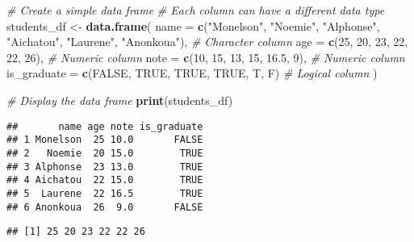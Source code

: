 \documentclass[
]{book}
\newenvironment{Shaded}{\begin{snugshade}}{\end{snugshade}}
\newcommand{\AttributeTok}[1]{\textcolor[rgb]{0.13,0.29,0.53}{#1}}
\newcommand{\CommentTok}[1]{\textcolor[rgb]{0.56,0.35,0.01}{\textit{#1}}}
\newcommand{\ConstantTok}[1]{\textcolor[rgb]{0.56,0.35,0.01}{#1}}
\newcommand{\DecValTok}[1]{\textcolor[rgb]{0.00,0.00,0.81}{#1}}
\newcommand{\FloatTok}[1]{\textcolor[rgb]{0.00,0.00,0.81}{#1}}
\newcommand{\FunctionTok}[1]{\textcolor[rgb]{0.13,0.29,0.53}{\textbf{#1}}}
\newcommand{\NormalTok}[1]{#1}
\newcommand{\OtherTok}[1]{\textcolor[rgb]{0.56,0.35,0.01}{#1}}
\newcommand{\SpecialCharTok}[1]{\textcolor[rgb]{0.81,0.36,0.00}{\textbf{#1}}}
\newcommand{\StringTok}[1]{\textcolor[rgb]{0.31,0.60,0.02}{#1}}
\begin{document}
\begin{Shaded}
\begin{Highlighting}[]
\CommentTok{\# Create a simple data frame}
\CommentTok{\# Each column can have a different data type}
\NormalTok{students\_df }\OtherTok{\textless{}{-}} \FunctionTok{data.frame}\NormalTok{(}
  \AttributeTok{name =} \FunctionTok{c}\NormalTok{(}\StringTok{"Monelson"}\NormalTok{, }\StringTok{"Noemie"}\NormalTok{, }\StringTok{"Alphonse"}\NormalTok{, }\StringTok{"Aichatou"}\NormalTok{, }\StringTok{"Laurene"}\NormalTok{, }\StringTok{"Anonkoua"}\NormalTok{),    }\CommentTok{\# Character column}
  \AttributeTok{age =} \FunctionTok{c}\NormalTok{(}\DecValTok{25}\NormalTok{, }\DecValTok{20}\NormalTok{, }\DecValTok{23}\NormalTok{, }\DecValTok{22}\NormalTok{, }\DecValTok{22}\NormalTok{, }\DecValTok{26}\NormalTok{),                    }\CommentTok{\# Numeric column}
  \AttributeTok{note =} \FunctionTok{c}\NormalTok{(}\DecValTok{10}\NormalTok{, }\DecValTok{15}\NormalTok{, }\DecValTok{13}\NormalTok{, }\DecValTok{15}\NormalTok{, }\FloatTok{16.5}\NormalTok{, }\DecValTok{9}\NormalTok{),                 }\CommentTok{\# Numeric column}
  \AttributeTok{is\_graduate =} \FunctionTok{c}\NormalTok{(}\ConstantTok{FALSE}\NormalTok{, }\ConstantTok{TRUE}\NormalTok{, }\ConstantTok{TRUE}\NormalTok{, }\ConstantTok{TRUE}\NormalTok{, T, F)      }\CommentTok{\# Logical column}
\NormalTok{)}

\CommentTok{\# Display the data frame}
\FunctionTok{print}\NormalTok{(students\_df)}
\end{Highlighting}
\end{Shaded}

\begin{verbatim}
##       name age note is_graduate
## 1 Monelson  25 10.0       FALSE
## 2   Noemie  20 15.0        TRUE
## 3 Alphonse  23 13.0        TRUE
## 4 Aichatou  22 15.0        TRUE
## 5  Laurene  22 16.5        TRUE
## 6 Anonkoua  26  9.0       FALSE
\end{verbatim}

\begin{Shaded}
\end{Shaded}

\begin{verbatim}
## [1] 25 20 23 22 22 26
\end{verbatim}
\end{document}
